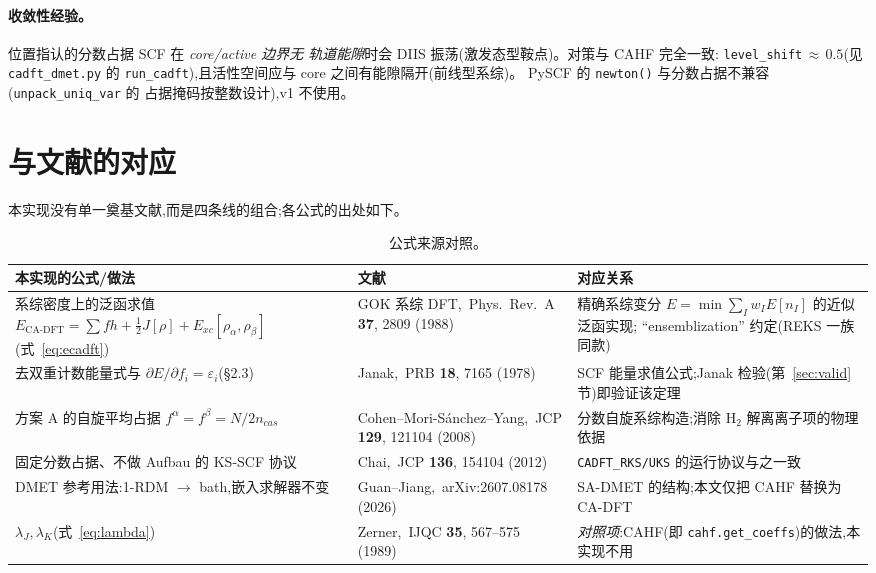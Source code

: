 \documentclass[11pt,a4paper]{ctexart}
\begin{document}
\paragraph{收敛性经验。}位置指认的分数占据 SCF 在 \emph{core/active 边界无
轨道能隙}时会 DIIS 振荡(激发态型鞍点)。对策与 CAHF 完全一致:
\texttt{level\_shift}$\,\approx\,0.5$(见 \texttt{cadft\_dmet.py} 的
\texttt{run\_cadft}),且活性空间应与 core 之间有能隙隔开(前线型系综)。
PySCF 的 \texttt{newton()} 与分数占据不兼容(\texttt{unpack\_uniq\_var} 的
占据掩码按整数设计),v1 不使用。

\section{与文献的对应}\label{sec:ref}

本实现没有单一奠基文献,而是四条线的组合;各公式的出处如下。

\begin{table}[h]
\centering
\begin{tabular}{p{4.4cm}p{4.6cm}p{4.6cm}}
\toprule
本实现的公式/做法 & 文献 & 对应关系 \\
\midrule
系综密度上的泛函求值
$E_{\mathrm{CA\text{-}DFT}}=\sum fh+\frac12J[\rho]+E_{xc}[\rho_\alpha,\rho_\beta]$
(式~\ref{eq:ecadft})
& GOK 系综 DFT,\ Phys.\ Rev.\ A \textbf{37}, 2809 (1988)
& 精确系综变分 $E=\min\sum_I w_I E[n_I]$ 的近似泛函实现;
  ``ensemblization'' 约定(REKS 一族同款) \\
\addlinespace
去双重计数能量式与
$\partial E/\partial f_i=\varepsilon_i$(§2.3)
& Janak,\ PRB \textbf{18}, 7165 (1978)
& SCF 能量求值公式;Janak 检验(第~\ref{sec:valid}节)即验证该定理 \\
\addlinespace
方案 A 的自旋平均占据
$f^\alpha=f^\beta=N/2n_{cas}$
& Cohen--Mori-S\'anchez--Yang,\ JCP \textbf{129}, 121104 (2008)
& 分数自旋系综构造;消除 H$_2$ 解离离子项的物理依据 \\
\addlinespace
固定分数占据、不做 Aufbau 的 KS-SCF 协议
& Chai,\ JCP \textbf{136}, 154104 (2012)
& \texttt{CADFT\_RKS/UKS} 的运行协议与之一致 \\
\addlinespace
DMET 参考用法:1-RDM $\to$ bath,嵌入求解器不变
& Guan--Jiang,\ arXiv:2607.08178 (2026)
& SA-DMET 的结构;本文仅把 CAHF 替换为 CA-DFT \\
\addlinespace
$\lambda_J,\lambda_K$(式~\ref{eq:lambda})
& Zerner,\ IJQC \textbf{35}, 567--575 (1989)
& \emph{对照项}:CAHF(即 \texttt{cahf.get\_coeffs})的做法,本实现不用 \\
\bottomrule
\end{tabular}
\caption{公式来源对照。}
\end{table}
\end{document}
